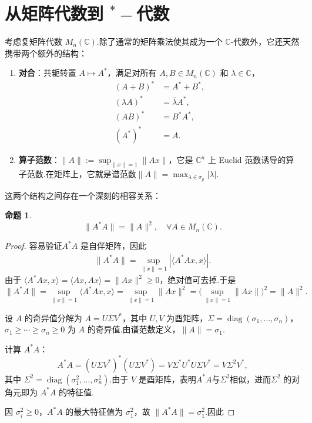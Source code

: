 \documentclass[math-font=lm, text-font=lm, math-style=TeX]{sjtureport}
\newtheorem{proposition}[theorem]{命题}
\theoremstyle{plain}
\newtheorem*{proof}{证明}
\theoremstyle{plain}
\begin{document}
\section{从矩阵代数到 ${}^*-\!$代数}

考虑复矩阵代数 $M_n(\mathbb{C})$.除了通常的矩阵乘法使其成为一个 $\mathbb{C}$-代数外，它还天然携带两个额外的结构：

\begin{enumerate}
    \item \textbf{对合}：共轭转置 $A \mapsto A^*$，满足对所有 $A, B \in M_n(\mathbb{C})$ 和 $\lambda \in \mathbb{C}$，
    \begin{align}
        (A+B)^* &= A^* + B^*, \\
        (\lambda A)^* &= \overline{\lambda} A^*, \\
        (AB)^* &= B^* A^*, \\
        (A^*)^* &= A.
    \end{align}
    \item \textbf{算子范数}：$\|A\| := \sup_{\|x\|=1} \|Ax\|$，它是 $\mathbb{C}^n$ 上 Euclid 范数诱导的算子范数.在矩阵上，它就是谱范数$\|A\|=\max_{\lambda\in \sigma_p}{|\lambda|}.$
\end{enumerate}

这两个结构之间存在一个深刻的相容关系：

\begin{proposition}
\begin{equation}\label{eq:Cstar-condition-matrix}
    \|A^*A\| = \|A\|^2, \quad \forall A \in M_n(\mathbb{C}).
\end{equation}
\end{proposition}
\begin{proof}


 容易验证$A^*A$ 是自伴矩阵，因此
\begin{align*}
    \|A^*A\| = \sup_{\|x\|=1} |\langle A^*A x, x\rangle|.
\end{align*}
由于 $\langle A^*A x, x\rangle = \langle Ax, Ax\rangle = \|Ax\|^2 \ge 0$，绝对值可去掉.于是
\begin{equation}\label{eq:Cstar-proof}
    \|A^*A\| = \sup_{\|x\|=1} \langle A^*A x, x\rangle = \sup_{\|x\|=1} \|Ax\|^2 = \bigl(\sup_{\|x\|=1} \|Ax\|\bigr)^2 = \|A\|^2.
\end{equation}

 设 $A$ 的奇异值分解为 $A = U\Sigma V^*$，其中 $U,V$ 为酉矩阵，$\Sigma = \operatorname{diag}(\sigma_1,\dots,\sigma_n)$，$\sigma_1 \ge \cdots \ge \sigma_n \ge 0$ 为 $A$ 的奇异值.由谱范数定义，$\|A\| = \sigma_1$.

计算 $A^*A$：
\begin{equation*}
    A^*A = (U\Sigma V^*)^*(U\Sigma V^*) = V\Sigma^*U^*U\Sigma V^* = V\Sigma^2 V^*,
\end{equation*}
其中 $\Sigma^2 = \operatorname{diag}(\sigma_1^2,\dots,\sigma_n^2)$.由于 $V$ 是酉矩阵，表明$A^*A$与$\Sigma^2$相似，进而$\Sigma^2$ 的对角元即为 $A^*A$ 的特征值.

因 $\sigma_i^2 \ge 0$，$A^*A$ 的最大特征值为 $\sigma_1^2$，故 $\|A^*A\| = \sigma_1^2$.因此
\end{proof}
\end{document}
